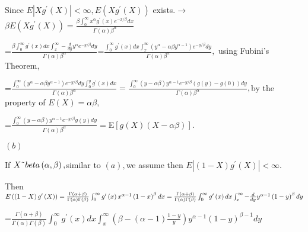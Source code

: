 \documentclass{article}
\begin{document}
Since $E\left\vert Xg^{\prime }\left( X\right) \right\vert <\infty ,E\left(
Xg^{\prime }\left( X\right) \right) $ exists.$\rightarrow $ $\beta E\left(
Xg^{\prime }\left( X\right) \right) =\frac{\beta \int_{0}^{\infty }x^{\alpha
}g^{\prime }\left( x\right) e^{-x/\beta }dx}{\Gamma \left( \alpha \right)
\beta ^{\alpha }}$

=$\frac{\beta \int_{0}^{\infty }g^{\prime }\left( x\right)
dx\int_{x}^{\infty }-\frac{d}{dy}y^{\alpha }e^{-y/\beta }dy}{\Gamma \left(
\alpha \right) \beta ^{\alpha }}$=$\frac{\int_{0}^{\infty }g^{\prime }\left(
x\right) dx\int_{x}^{\infty }\left( y^{\alpha }-\alpha \beta y^{\alpha
-1}\right) e^{-y/\beta }dy}{\Gamma \left( \alpha \right) \beta ^{\alpha }},$%
using Fubini's Theorem,

=$\frac{\int_{0}^{\infty }\left( y^{\alpha }-\alpha \beta y^{\alpha
-1}\right) e^{-y/\beta }dy\int_{0}^{y}g^{\prime }\left( x\right) dx}{\Gamma
\left( \alpha \right) \beta ^{\alpha }}=\frac{\int_{0}^{\infty }\left(
y-\alpha \beta \right) y^{\alpha -1}e^{-y/\beta }\left( g\left( y\right)
-g\left( 0\right) \right) dy}{\Gamma \left( \alpha \right) \beta ^{\alpha }},
$by the property of $E\left( X\right) =\alpha \beta ,$

=$\frac{\int_{0}^{\infty }\left( y-\alpha \beta \right) y^{\alpha
-1}e^{-y/\beta }g\left( y\right) dy}{\Gamma \left( \alpha \right) \beta
^{\alpha }}=$E$\left[ g\left( X\right) \left( X-\alpha \beta \right) \right]
.$

$\left( b\right) $

If $X\symbol{126}beta\left( \alpha ,\beta \right) ,$similar to $\left(
a\right) ,$we assume then $E\left\vert \left( 1-X\right) g^{\prime }\left(
X\right) \right\vert <\infty .$

Then $E\left( \left( 1-X\right) g^{\prime }\left( X\right) \right) =\frac{%
\Gamma \left( \alpha +\beta \right) }{\Gamma \left( \alpha \right) \Gamma
\left( \beta \right) }\int_{0}^{\infty }g^{\prime }\left( x\right) x^{\alpha
-1}\left( 1-x\right) ^{\beta }dx=\frac{\Gamma \left( \alpha +\beta \right) }{%
\Gamma \left( \alpha \right) \Gamma \left( \beta \right) }\int_{0}^{\infty
}g^{\prime }\left( x\right) dx\int_{x}^{\infty }-\frac{d}{dy}y^{\alpha
-1}\left( 1-y\right) ^{\beta }dy$

=$\frac{\Gamma \left( \alpha +\beta \right) }{\Gamma \left( \alpha \right)
\Gamma \left( \beta \right) }\int_{0}^{\infty }g^{\prime }\left( x\right)
dx\int_{x}^{\infty }\left( \beta -\left( \alpha -1\right) \frac{1-y}{y}%
\right) y^{\alpha -1}\left( 1-y\right) ^{\beta -1}dy$
\end{document}
